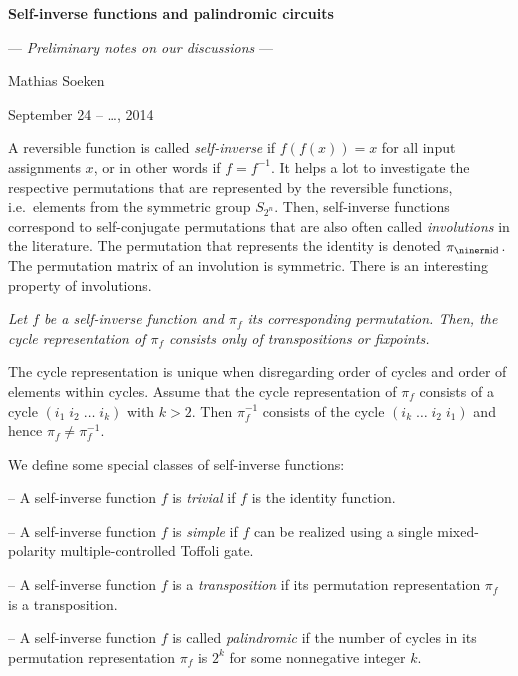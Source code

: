 \def\slug{\hbox{\kern1.5pt\vrule width2.5pt height6pt depth1.5pt\kern1.5pt}}
\def\slugonright{\vrule width0pt\nobreak\hfill\slug}

\centerline{\bf Self-inverse functions and palindromic circuits}
\centerline{--- {\it Preliminary notes on our discussions\/} ---}
\centerline{Mathias Soeken}
\centerline{September 24 -- \dots, 2014}

\bigskip
\bigskip

\enspace A reversible function is
called {\it self-inverse\/} if $f(f(x))=x$ for all input assignments $x$, or in
other words if $f=f^{-1}$.  It helps a lot to investigate the respective
permutations that are represented by the reversible functions, i.e.~elements
from the symmetric group $S_{2^n}$.  Then, self-inverse functions correspond to
self-conjugate permutations that are also often called {\it involutions\/} in
the literature.  The permutation that represents the identity is denoted
$\pi_{\rm id}$.  The permutation matrix of an involution is symmetric.  There is
an interesting property of involutions.

\smallskip {} \sl Let $f$ be a self-inverse function and
$\pi_f$ its corresponding permutation.  Then, the cycle representation of
$\pi_f$ consists only of transpositions or fixpoints. \rm

\smallskip{} The cycle representation is unique when
disregarding order of cycles and order of elements within cycles.  Assume that
the cycle representation of $\pi_f$ consists of a cycle $(i_1\; i_2\; \ldots \;
i_k)$ with $k>2$.  Then $\pi_f^{-1}$ consists of the cycle $(i_k \; \ldots \;
i_2 \; i_1)$ and hence $\pi_f\neq \pi_f^{-1}$. \qquad\slug

\smallskip\noindent We define some special classes of self-inverse functions:

\item{--} A self-inverse function $f$ is {\it trivial\/} if $f$ is the identity
function.
\item{--} A self-inverse function $f$ is {\it simple\/} if $f$ can be realized
using a single mixed-polarity multiple-controlled Toffoli gate.
\item{--} A self-inverse function $f$ is a {\it transposition\/} if its
permutation representation $\pi_f$ is a transposition.
\item{--} A self-inverse function $f$ is called {\it palindromic\/} if the
number of cycles in its permutation representation $\pi_f$ is $2^k$ for some
nonnegative integer $k$.


